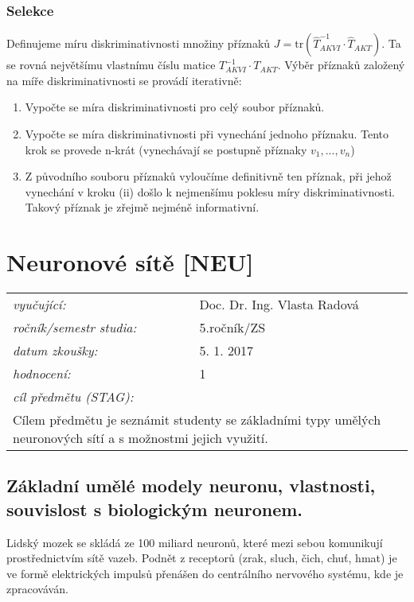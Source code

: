\subsubsection*{Selekce}
Definujeme míru diskriminativnosti množiny příznaků $ J = \mathrm{tr}(\hat{T}_{AKVI}^{-1} \cdot \hat{T}_{AKT}) $. Ta se rovná největšímu vlastnímu číslu matice $ T_{AKVI}^{-1} \cdot T_{AKT} $. Výběr příznaků založený na míře diskriminativnosti se provádí iterativně:
\begin{enumerate}[label=(\roman*)]
\item Vypočte se míra diskriminativnosti pro celý soubor příznaků.
\item Vypočte se míra diskriminativnosti při vynechání jednoho příznaku. Tento krok se provede n-krát (vynechávají se postupně příznaky $ v_1, ..., v_n $)
\item Z původního souboru příznaků vyloučíme definitivně ten příznak, při jehož vynechání v kroku (ii) došlo k nejmenšímu poklesu míry diskriminativnosti. Takový příznak je zřejmě nejméně informativní.
\end{enumerate}
\vspace{2cm}

\section{Neuronové sítě [NEU]}

\begin{table}[H]
\centering
\begin{tabular}{p{4cm} p{12cm}}
\textit{vyučující:}             & Doc. Dr. Ing. Vlasta Radová \\
\textit{ročník/semestr studia:} & 5.ročník/ZS \\
\textit{datum zkoušky:}         & 5. 1. 2017 \\
\textit{hodnocení:}             & 1 \\
\textit{cíl předmětu (STAG):}   & \\
\multicolumn{2}{p{16cm}}{Cílem předmětu je seznámit studenty se základními typy umělých neuronových sítí a s možnostmi jejich využití.}
\end{tabular}
\end{table}

\subsection{Základní umělé modely neuronu, vlastnosti, souvislost s biologickým neuronem.}
Lidský mozek se skládá ze 100 miliard neuronů, které mezi sebou komunikují prostřednictvím sítě vazeb. Podnět z receptorů (zrak, sluch, čich, chuť, hmat) je ve formě elektrických impulsů přenášen do centrálního nervového systému, kde je zpracováván.

